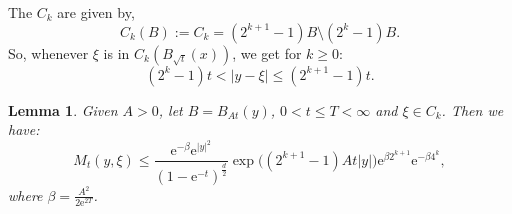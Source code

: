 \documentclass[a4paper,oneside,10pt]{amsproc}
\theoremstyle{plain}
\newtheorem{lemma}{Lemma}
\theoremstyle{remark}
\renewcommand{\leq}{\leqslant}
\renewcommand{\leq}{\leqslant}
\renewcommand{\geq}{\geqslant}
\newcommand{\e}{\mathrm{e}} %
\renewcommand{\leq}{\leqslant}%
\renewcommand{\geq}{\geqslant}%
\begin{document}
The $C_k$ are given by,
\begin{equation}
  \label{eq:C_k-annulus-decomposition}
  C_k(B) := C_k = (2^{k + 1} - 1)B \setminus (2^k - 1)B.
\end{equation}
So, whenever $\xi$ is in $C_k(B_{\sqrt t}(x))$, we get for $k \geq 0$:
\begin{equation}
  \label{eq:C_k-annulus-decomposition-expand}
  (2^k - 1) t < |y - \xi| \leq (2^{k + 1} - 1) t.
\end{equation}

\begin{lemma}\label{lem:On-diagonal-kernel-estimates-on-Ck}
  Given $A > 0$, let $B = B_{At}(y)$, $0 < t \leq T < \infty$ and $\xi \in C_k$. Then we have:
  \begin{equation*}
    M_t(y, \xi) \leq \frac{\e^{-\beta} \e^{|y|^2}}{(1 - \e^{-t})^{\frac{d}2}}
    \exp\bigl((2^{k + 1} - 1) A t |y| \bigr) \e^{\beta 2^{k + 1}} \e^{-\beta 4^k},
  \end{equation*}
  where $\beta = \frac{A^2}{2 \e^{2T}}$.
\end{lemma}
\end{document}
